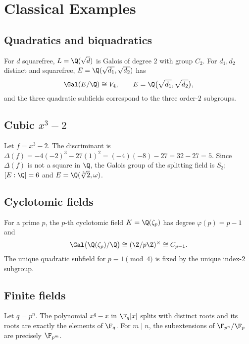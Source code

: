 \section{Classical Examples}

\subsection{Quadratics and biquadratics}
\begin{example}
For $d$ squarefree, $L=\Q(\sqrt{d})$ is Galois of degree $2$ with group $C_2$.  
For $d_1,d_2$ distinct and squarefree, $E=\Q(\sqrt{d_1},\sqrt{d_2})$ has
\[
\Gal(E/\Q)\cong V_4,\qquad E=\Q\big(\sqrt{d_1},\sqrt{d_2}\big),
\]
and the three quadratic subfields correspond to the three order-$2$ subgroups.
\end{example}

\subsection{Cubic $x^3-2$}
\begin{example}
Let $f=x^3-2$. The discriminant is $\Delta(f)=-4(-2)^3-27(1)^2=(-4)(-8)-27=32-27=5$. Since $\Delta(f)$ is not a square in $\Q$, the Galois group of the splitting field is $S_3$; $[E:\Q]=6$ and $E=\Q(\sqrt[3]{2},\omega)$.
\end{example}

\subsection{Cyclotomic fields}
\begin{example}
For a prime $p$, the $p$-th cyclotomic field $K=\Q(\zeta_p)$ has degree $\varphi(p)=p-1$ and
\[
\Gal\big(\Q(\zeta_p)/\Q\big)\cong(\Z/p\Z)^\times\cong C_{p-1}.
\]
The unique quadratic subfield for $p\equiv1\pmod 4$ is fixed by the unique index-$2$ subgroup.
\end{example}

\subsection{Finite fields}
\begin{example}
Let $q=p^n$. The polynomial $x^{q}-x$ in $\F_q[x]$ splits with distinct roots and its roots are exactly the elements of $\F_q$. For $m\mid n$, the subextensions of $\F_{p^n}/\F_p$ are precisely $\F_{p^m}$.
\end{example}

